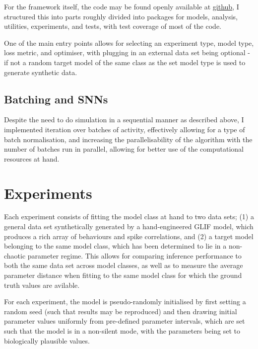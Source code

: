 \documentclass[mphil,deptreport,ianc]{infthesis} %
\begin{document}
For the framework itself, the code may be found openly available at \href{https://github.com/williampeer/snn_inference}{github}, I structured this into parts roughly divided into packages for models, analysis, utilities, experiments, and tests, with test coverage of most of the code.

One of the main entry points allows for selecting an experiment type, model type, loss metric, and optimiser, with plugging in an external data set being optional - if not a random target model of the same class as the set model type is used to generate synthetic data.


\subsection{Batching and SNNs}

Despite the need to do simulation in a sequential manner as described above, I implemented iteration over batches of activity, effectively allowing for a type of batch normalisation, and increasing the parallelisability of the algorithm with the number of batches run in parallel, allowing for better use of the computational resources at hand.


\section{Experiments}

Each experiment consists of fitting the model class at hand to two data sets; (1) a general data set synthetically generated by a hand-engineered GLIF model, which produces a rich array of behaviours and spike correlations, and (2) a target model belonging to the same model class, which has been determined to lie in a non-chaotic parameter regime.
This allows for comparing inference performance to both the same data set across model classes, as well as to measure the average parameter distance when fitting to the same model class for which the ground truth values are avilable.


For each experiment, the model is pseudo-randomly initialised by first setting a random seed (such that results may be reproduced) and then drawing initial parameter values uniformly from pre-defined parameter intervals, which are set such that the model is in a non-silent mode, with the parameters being set to biologically plausible values.
\end{document}

